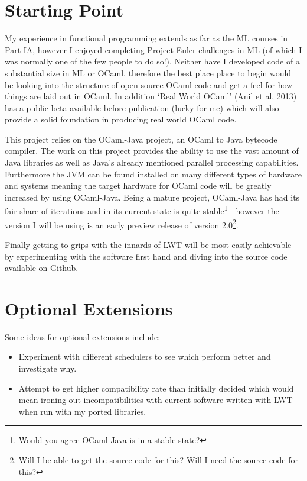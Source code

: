 \documentclass[a4paper]{article}
\begin{document}
\section{Starting Point}
\label{sec:starting}
My experience in functional programming extends as far as the ML courses in Part IA, however I enjoyed completing Project Euler challenges in ML (of which I was normally one of the few people to do so!). Neither have I developed code of a substantial size in ML or OCaml, therefore the best place place to begin would be looking into the structure of open source OCaml code and get a feel for how things are laid out in OCaml. In addition `Real World OCaml' (Anil et al, 2013) has a public beta available before publication (lucky for me) which will also provide a solid foundation in producing real world OCaml code.

This project relies on the OCaml-Java project, an OCaml to Java bytecode compiler. The work on this project provides the ability to use the vast amount of Java libraries as well as Java's already mentioned parallel processing capabilities. Furthermore the JVM can be found installed on many different types of hardware and systems meaning the target hardware for OCaml code will be greatly increased by using OCaml-Java. Being a mature project, OCaml-Java has had its fair share of iterations and in its current state is quite stable\footnote{Would you agree OCaml-Java is in a stable state?} - however the version I will be using is an early preview release of version 2.0\footnote{Will I be able to get the source code for this? Will I need the source code for this?}.

Finally getting to grips with the innards of LWT will be most easily achievable by experimenting with the software first hand and diving into the source code available on Github.

\section{Optional Extensions}
\label{sec:optional}
Some ideas for optional extensions include:
\begin{itemize}
\item{Experiment with different schedulers to see which perform better and investigate why.}
\item{Attempt to get higher compatibility rate than initially decided which would mean ironing out incompatibilities with current software written with LWT when run with my ported libraries.}
\end{itemize}
\end{document}
